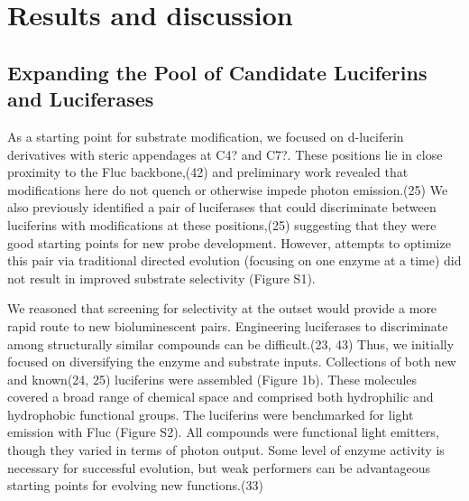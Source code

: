 \section{Results and discussion}
\subsection*{Expanding the Pool of Candidate Luciferins and Luciferases}
As a starting point for substrate modification, we focused on d-luciferin derivatives with steric appendages at C4? and C7?. These positions lie in close proximity to the Fluc backbone,(42) and preliminary work revealed that modifications here do not quench or otherwise impede photon emission.(25) We also previously identified a pair of luciferases that could discriminate between luciferins with modifications at these positions,(25) suggesting that they were good starting points for new probe development. However, attempts to optimize this pair via traditional directed evolution (focusing on one enzyme at a time) did not result in improved substrate selectivity (Figure S1).
\par
We reasoned that screening for selectivity at the outset would provide a more rapid route to new bioluminescent pairs. Engineering luciferases to discriminate among structurally similar compounds can be difficult.(23, 43) Thus, we initially focused on diversifying the enzyme and substrate inputs. Collections of both new and known(24, 25) luciferins were assembled (Figure 1b). These molecules covered a broad range of chemical space and comprised both hydrophilic and hydrophobic functional groups. The luciferins were benchmarked for light emission with Fluc (Figure S2). All compounds were functional light emitters, though they varied in terms of photon output. Some level of enzyme activity is necessary for successful evolution, but weak performers can be advantageous starting points for evolving new functions.(33)
\par
